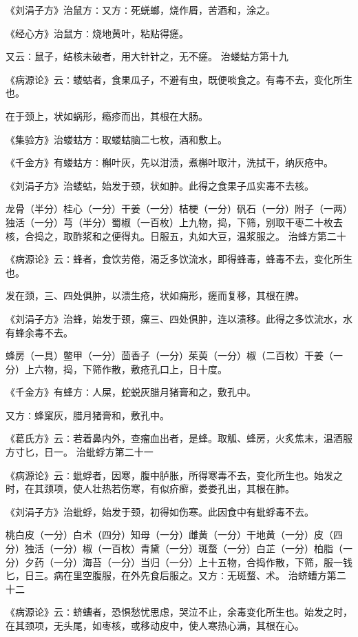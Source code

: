 \documentclass[a4paper,12pt,UTF8,twoside]{ctexbook}
\begin{document}
《刘涓子方》治鼠方∶又方∶死蜣螂，烧作屑，苦酒和，涂之。

《经心方》治鼠方∶烧地黄叶，粘贴得瘥。

又云∶鼠子，结核未破者，用大针针之，无不瘥。
治蝼蛄方第十九

《病源论》云∶蝼蛄者，食果瓜子，不避有虫，既便啖食之。有毒不去，变化所生也。

在于颈上，状如蜗形，瘾疹而出，其根在大肠。

《集验方》治蝼蛄方∶取蝼蛄脑二七枚，酒和敷上。

《千金方》有蝼蛄方∶槲叶灰，先以泔渍，煮槲叶取汁，洗拭干，纳灰疮中。

《刘涓子方》治蝼蛄，始发于颈，状如肿。此得之食果子瓜实毒不去核。

龙骨（半分）桂心（一分）干姜（一分）桔梗（一分）矾石（一分）附子（一两）独活（一分）芎（半分）蜀椒（一百枚）上九物，捣，下筛，别取干枣二十枚去核，合捣之，取酢浆和之便得丸。日服五，丸如大豆，温浆服之。
治蜂方第二十

《病源论》云∶蜂者，食饮劳倦，渴乏多饮流水，即得蜂毒，蜂毒不去，变化所生也。

发在颈，三、四处俱肿，以溃生疮，状如痈形，瘥而复移，其根在脾。

《刘涓子方》治蜂，始发于颈，瘰三、四处俱肿，连以溃移。此得之多饮流水，水有蜂余毒不去。

蜂房（一具）鳖甲（一分）茴香子（一分）茱萸（一分）椒（二百枚）干姜（一分）上六物，捣，下筛作散，敷疮孔口上，日十度。

《千金方》有蜂方∶人屎，蛇蜕灰腊月猪膏和之，敷孔中。

又方∶蜂窠灰，腊月猪膏和，敷孔中。

《葛氏方》云∶若着鼻内外，查瘤血出者，是蜂。取觚、蜂房，火炙焦末，温酒服方寸匕，日一。
治蚍蜉方第二十一

《病源论》云∶蚍蜉者，因寒，腹中胪胀，所得寒毒不去，变化所生也。始发之时，在其颈项，使人壮热若伤寒，有似疥癣，娄娄孔出，其根在肺。

《刘涓子方》治蚍蜉，始发于颈，初得如伤寒。此因食中有蚍蜉毒不去。

桃白皮（一分）白术（四分）知母（一分）雌黄（一分）干地黄（一分）皮（四分）独活（一分）椒（一百枚）青黛（一分）斑蝥（一分）白芷（一分）柏脂（一分）夕药（一分）海苔（一分）当归（一分）上十五物，合捣作散，下筛，服一钱匕，日三。病在里空腹服，在外先食后服之。又方∶无斑蝥、术。
治蛴螬方第二十二

《病源论》云∶蛴螬者，恐惧愁忧思虑，哭泣不止，余毒变化所生也。始发之时，在其颈项，无头尾，如枣核，或移动皮中，使人寒热心满，其根在心。
\end{document}
